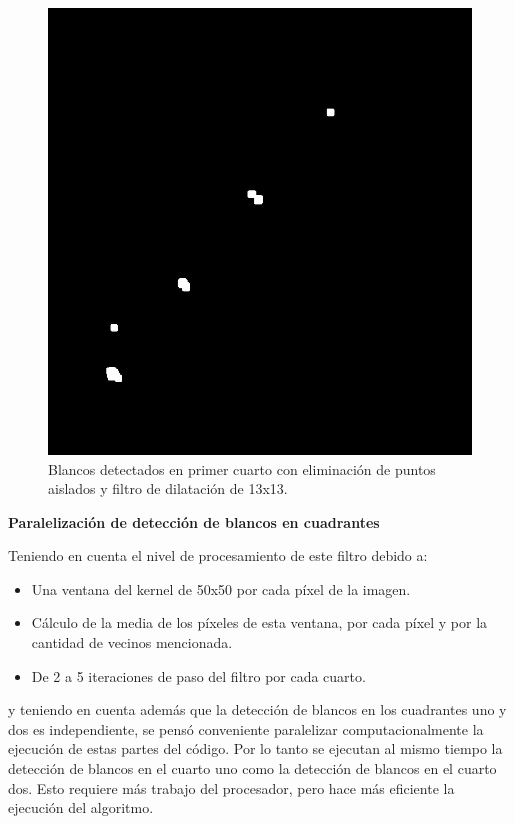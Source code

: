\documentclass[10pt,a4paper, twoside]{report}
\begin{document}
\begin{figure}[!htb]
\begin {minipage}{0.48\textwidth}
			\includegraphics[width=1.0\linewidth]{imagenes/sndQuarterFourierMask.jpg}
			\caption{Blancos detectados en primer cuarto con eliminación de puntos aislados y filtro de dilatación de 13x13.}
			\label{firstQuarterMask}
   \end{minipage}
\end{figure}



\textbf{Paralelización de detección de blancos en cuadrantes}

Teniendo en cuenta el nivel de procesamiento de este filtro debido a:

\begin{itemize}
	\item Una ventana del kernel de 50x50 por cada píxel de la imagen.
	\item Cálculo de la media de los píxeles de esta ventana, por cada píxel y por la cantidad de vecinos mencionada.
	\item De 2 a 5 iteraciones de paso del filtro por cada cuarto.
\end{itemize}	

y teniendo en cuenta además que la detección de blancos en los cuadrantes uno y dos es independiente, se pensó conveniente paralelizar computacionalmente la ejecución de estas partes del código. Por lo tanto se ejecutan al mismo tiempo la detección de blancos en el cuarto uno como la detección de blancos en el cuarto dos. Esto requiere más trabajo del procesador, pero hace más eficiente la ejecución del algoritmo.
\end{document}
